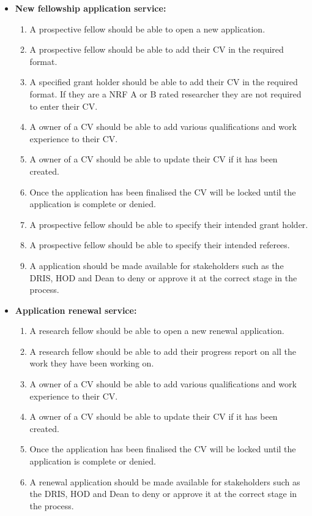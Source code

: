 \documentclass[12pt]{article}
\begin{document}
\begin{itemize}
		\item\textbf{ New fellowship application service:}		
		\begin{enumerate}			
			\item A prospective fellow should be able to open a new application.
			\item A prospective fellow should be able to add their CV in the required format.
			\item A specified grant holder should be able to add their CV in the required format. If they are a NRF A or B rated researcher they are not required to enter their CV.
			\item A owner of a CV should be able to add various qualifications and work experience to their CV. 
			\item A owner of a CV should be able to update their CV if it has been created. 
			\item Once the application has been finalised the CV will be locked until the application is complete or denied.
			\item A prospective fellow should be able to specify their intended grant holder.	
			\item A prospective fellow should be able to specify their intended referees.				
			\item A application should be made available for stakeholders such as the DRIS, HOD and Dean to deny or approve it at the correct stage in the process. 		
		\end{enumerate}			
		\item\textbf{ Application renewal service:}
		\begin{enumerate}					
			\item A research fellow should be able to open a new renewal application. 
			\item A research fellow should be able to add their progress report on all the work they have been working on.	
			\item A owner of a CV should be able to add various qualifications and work experience to their CV. 
			\item A owner of a CV should be able to update their CV if it has been created. 
			\item Once the application has been finalised the CV will be locked until the application is complete or denied.
			\item A renewal application should be made available for stakeholders such as the DRIS, HOD and Dean to deny or approve it at the correct stage in the process.							 					

\end{enumerate}
\end{itemize}
\end{document}
